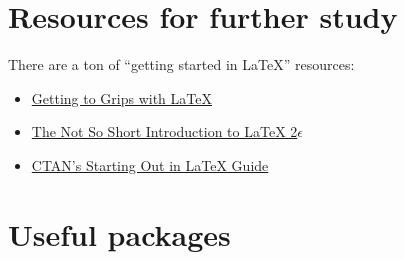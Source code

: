 \documentclass{article}
\begin{document}
\section{Resources for further study}

There are a ton of ``getting started in \LaTeX'' resources:
\begin{itemize}
	\item \href{http://www.andy-roberts.net/writing/latex}{Getting to Grips with LaTeX}
	\item \href{ftp://ctan.tug.org/tex-archive/info/lshort/english/lshort.pdf}{The Not So Short Introduction to LaTeX 2$\epsilon$}
	\item \href{https://www.ctan.org/starter}{CTAN's Starting Out in LaTeX Guide}
\end{itemize}


\clearpage
\appendix
\section{Useful packages}
\end{document}
